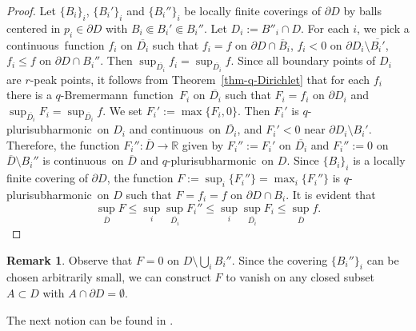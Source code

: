 \documentclass[reqno]{amsart}
\theoremstyle{definition}
\newtheorem{rem}[thm]{Remark}
\numberwithin{equation}{section}
\newcommand{\TP}[1]{\textcolor{red}{[#1]}}
\newcommand{\rbb}{\mathbb{R}}
\newcommand{\pcal}{\mathcal{P}}
\newcommand{\qbrem}{$q$-Bremermann}
\newcommand{\qpsh}{$q$-pluri\-sub\-harmonic}
\newcommand{\cl}[1]{\overline{#1}}
\newcommand{\cont}{continuous}
\newcommand{\fct}{function}
\newcommand{\fcts}{functions}
\newcommand{\cld}{\overline{D}}
\newcommand{\relc}{\Subset}
\begin{document}
\begin{proof} Let $\{B_i\}_i$, $\{B_i'\}_i$ and $\{B_i''\}_i$ be locally finite coverings of $\partial D$ by balls centered in $p_i \in \partial D$ with $B_i \relc B_i' \relc B_i''$. Let $D_i:=B''_i \cap D$. For each $i$, we pick a \cont\ function $f_i$ on $\overline{D_i}$ such that $f_i=f$ on $\partial D\cap\overline{B}_i$,  $f_i < 0$ on $\partial D_i \setminus \overline{B_i'}$, $f_i\leq f$ on $\partial D \cap B_i''$. Then $\sup_{\overline{D_i}} f_i = \sup_{\overline{D_i}} f$. Since all boundary points of $D_i$ are $r$-peak points, it follows from  Theorem~\ref{thm-q-Dirichlet} that for each $f_i$ there is a \qbrem\ \fct\ $F_i$ on $\overline{D_i}$ such that $F_i=f_i$ on $\partial D_i$ and $\sup_{\overline{D_i}} F_i = \sup_{\overline{D_i}} f$. We set $F_i':=\max\{ F_i, 0\}$. Then $F_i'$ is \qpsh\ on $D_i$ and \cont\ on $\cl{D_i}$, and $F_i'<0$ near $\partial D_i\setminus B_i'$. Therefore, the function $F_i'':\cld \to \rbb$ given by $F_i'':=F_i'$ on $\overline{D_i}$ and $F_i'':=0$ on $\cld\setminus B_i''$ is \cont\ on $\cld$ and \qpsh\ on $D$. Since $\{B_i\}_i$ is a locally finite covering of $\partial D$, the function $F:=\sup_i\{F_i''\}=\max_i\{ F_i''\}$ is \qpsh\ on $D$ such that $F=f_i=f$ on $\partial D \cap B_i$. It is evident that
\[
\sup_{\cld} F \leq \sup_i \sup_{\overline{D_i}} F_i'' \leq \sup_{i}\sup_{\overline{D_i}} F_i \leq \sup_{\cl{D}} f.
\]
\end{proof}

\begin{rem} Observe that $F=0$ on $D\setminus \bigcup_i B_i''$. Since the covering $\{B_i''\}_i$ can be chosen arbitrarily small, we can construct $F$ to vanish on any closed subset $A \subset D$ with $A \cap \partial D = \emptyset$.
\end{rem}


The next notion can be found in \cite{NH}.
\end{document}
